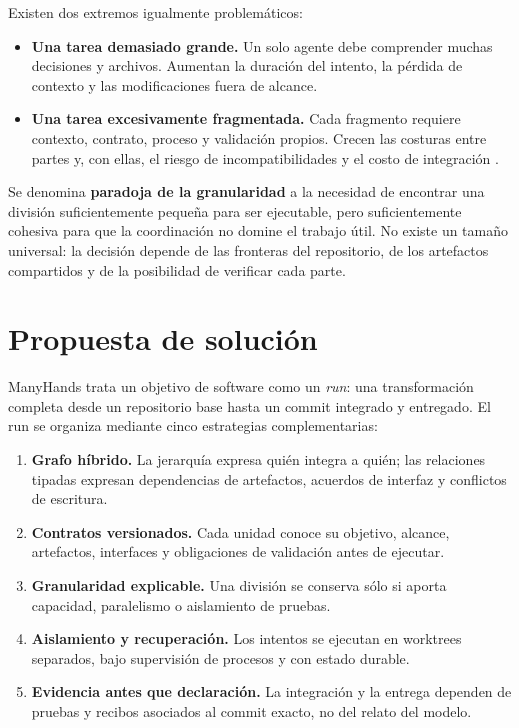 Existen dos extremos igualmente problemáticos:

\begin{itemize}
  \item \textbf{Una tarea demasiado grande.} Un solo agente debe comprender
  muchas decisiones y archivos. Aumentan la duración del intento, la pérdida de
  contexto y las modificaciones fuera de alcance.
  \item \textbf{Una tarea excesivamente fragmentada.} Cada fragmento requiere
  contexto, contrato, proceso y validación propios. Crecen las costuras entre
  partes y, con ellas, el riesgo de incompatibilidades y el costo de integración
  \cite{brooks1995mythical}.
\end{itemize}

Se denomina \textbf{paradoja de la granularidad} a la necesidad de encontrar
una división suficientemente pequeña para ser ejecutable, pero suficientemente
cohesiva para que la coordinación no domine el trabajo útil. No existe un
tamaño universal: la decisión depende de las fronteras del repositorio, de los
artefactos compartidos y de la posibilidad de verificar cada parte.

\section{Propuesta de solución}

ManyHands trata un objetivo de software como un \emph{run}: una transformación
completa desde un repositorio base hasta un commit integrado y entregado. El
run se organiza mediante cinco estrategias complementarias:

\begin{enumerate}
  \item \textbf{Grafo híbrido.} La jerarquía expresa quién integra a quién; las
  relaciones tipadas expresan dependencias de artefactos, acuerdos de interfaz
  y conflictos de escritura.
  \item \textbf{Contratos versionados.} Cada unidad conoce su objetivo, alcance,
  artefactos, interfaces y obligaciones de validación antes de ejecutar.
  \item \textbf{Granularidad explicable.} Una división se conserva sólo si
  aporta capacidad, paralelismo o aislamiento de pruebas.
  \item \textbf{Aislamiento y recuperación.} Los intentos se ejecutan en
  worktrees separados, bajo supervisión de procesos y con estado durable.
  \item \textbf{Evidencia antes que declaración.} La integración y la entrega
  dependen de pruebas y recibos asociados al commit exacto, no del relato del
  modelo.
\end{enumerate}

